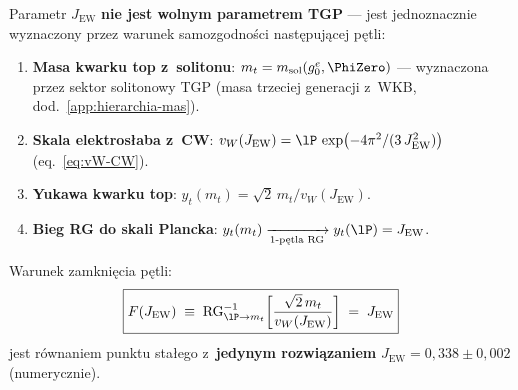 \begin{theorem}\label{thm:JEW-selfconsistency}

Parametr $J_{\mathrm{EW}}$ \textbf{nie jest wolnym parametrem TGP}
--- jest jednoznacznie wyznaczony przez warunek samozgodno\'sci
nast\k{e}puj\k{a}cej p\k{e}tli:

\begin{enumerate}[nosep]
  \item \textbf{Masa kwarku top z~solitonu}:
    $m_t = m_{\rm sol}(g_0^e, \PhiZero)$
    --- wyznaczona przez sektor solitonowy TGP
    (masa trzeciej generacji z~WKB, dod.~\ref{app:hierarchia-mas}).
  \item \textbf{Skala elektros\l{}aba z~CW}:
    $v_W(J_{\mathrm{EW}}) = \lP\,\exp\bigl(-4\pi^2/(3\,J_{\mathrm{EW}}^2)\bigr)$
    (eq.~\eqref{eq:vW-CW}).
  \item \textbf{Yukawa kwarku top}:
    $y_t(m_t) = \sqrt{2}\,m_t / v_W(J_{\mathrm{EW}})$.
  \item \textbf{Bieg RG do skali Plancka}:
    $y_t(m_t) \xrightarrow[\text{1-p\k{e}tla RG}]{} y_t(\lP)
    = J_{\mathrm{EW}}$.
\end{enumerate}

Warunek zamkni\k{e}cia p\k{e}tli:
\begin{equation}\label{eq:JEW-fixed-point}
  \boxed{F(J_{\mathrm{EW}}) \;\equiv\;
  \mathrm{RG}_{\lP \to m_t}^{-1}\!\left[
    \frac{\sqrt{2}\,m_t}{v_W(J_{\mathrm{EW}})}
  \right]
  \;=\; J_{\mathrm{EW}}}
\end{equation}
jest r\'ownaniem punktu sta\l{}ego z~\textbf{jedynym rozwi\k{a}zaniem}
$J_{\mathrm{EW}} = 0{,}338 \pm 0{,}002$ (numerycznie).
\end{theorem}

